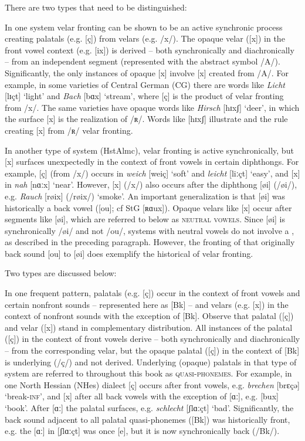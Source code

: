  There are two types that need to be distinguished:

In one system velar fronting can be shown to be an active synchronic process creating palatals (e.g. [ç]) from velars (e.g. /x/). The opaque velar ([x]) in the front vowel context (e.g. [ix]) is derived -- both synchronically and diachronically -- from an independent segment (represented with the abstract symbol /A/). Significantly, the only instances of opaque [x] involve [x] created from /A/. For example, in some varieties of Central German (CG) there are words like \textit{Licht} [lɪçt] ‘light’ and \textit{Bach} [bɑx] ‘stream’, where [ç] is the product of velar fronting from /x/. The same varieties have opaque words like \textit{Hirsch} [hɪxʃ] ‘deer’, in which the surface [x] is the realization of /ʀ/. Words like [hɪxʃ] illustrate  and the rule creating [x] from /ʀ/ \textsc{} velar fronting.

In another type of system (HstAlmc), velar fronting is active synchronically, but [x] surfaces unexpectedly in the context of front vowels in certain diphthongs. For example, [ç] (from /x/) occurs in \textit{weich} [weiç] ‘soft’ and \textit{leicht} [liːçt] ‘easy’, and [x] in \textit{nah} [nɑːx] ‘near’. However, [x] (/x/) also occurs after the diphthong [øi] (/øi/), e.g. \textit{Rauch} [røix] (/røix/) ‘smoke’. An important generalization is that [øi] was historically a back vowel ([ou]; cf StG [ʀɑux]). Opaque velars like [x] occur after segments like [øi], which are referred to below as \textsc{neutral} \textsc{vowels}. Since [øi] is synchronically /øi/ and not /ou/, systems with neutral vowels do not involve a , as described in the preceding paragraph. However, the fronting of that originally back sound [ou] to [øi] does exemplify the historical  of velar fronting.

 Two types are discussed below:

In one frequent pattern, palatals (e.g. [ç]) occur in the context of front vowels and certain nonfront sounds -- represented here as [Bk] -- and velars (e.g. [x]) in the context of  nonfront sounds with the exception of [Bk]. Observe that palatal ([ç]) and velar ([x]) stand in complementary distribution. All instances of the palatal ([ç]) in the context of front vowels derive -- both synchronically and diachronically -- from the corresponding velar, but the opaque palatal ([ç]) in the context of [Bk] is underlying (/ç/) and not derived. Underlying (opaque) palatals in that type of system are referred to throughout this book as \textsc{quasi-phonemes}. For example, in one North Hessian (NHes) dialect [ç] occurs after front vowels, e.g. \textit{brechen} [brɛçə] ‘break-\textsc{inf}’, and [x] after all back vowels with the exception of [ɑː], e.g. [bux] ‘book’. After [ɑː] the palatal surfaces, e.g. \textit{schlecht} [ʃlɑːçt] ‘bad’. Significantly, the back sound adjacent to all palatal quasi-phonemes ([Bk]) was historically front, e.g. the [ɑː] in [ʃlɑːçt] was once [e], but it is now synchronically back (/Bk/).

